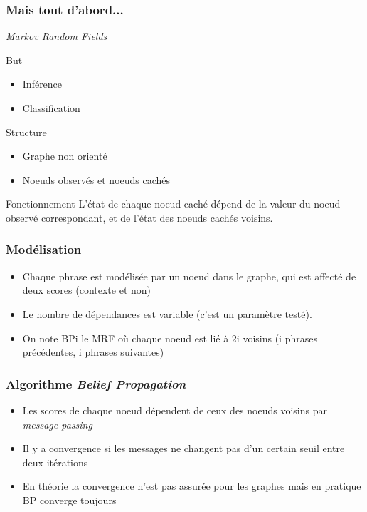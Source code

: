 \documentclass[12pt]{beamer}
\begin{document}
\begin{frame}
  \frametitle{Mais tout d'abord...}
  \textit{Markov Random Fields}
  \begin{block}{But}
  \begin{itemize}
   \item Inférence
   \item Classification
  \end{itemize}
  \end{block}
  
  \begin{block}{Structure}
  \begin{itemize}
   \item Graphe non orienté
   \item Noeuds observés et noeuds cachés
  \end{itemize}
  \end{block}
  
  \begin{block}{Fonctionnement}
  L'état de chaque noeud caché dépend de la valeur du noeud observé correspondant,
  et de l'état des noeuds cachés voisins.
  \end{block}
\end{frame}

\begin{frame}
  \frametitle{Modélisation}
  \begin{itemize}
   \item Chaque phrase est modélisée par un noeud dans le graphe, qui est affecté de deux scores (contexte et non)
   \item Le nombre de dépendances est variable (c'est un paramètre testé).
   \item On note BPi le MRF où chaque noeud est lié à 2i voisins (i phrases précédentes, i phrases suivantes)
  \end{itemize}
\end{frame}

\begin{frame}
  \frametitle{Algorithme \textit{Belief Propagation}}
  \begin{itemize}
   \item Les scores de chaque noeud dépendent de ceux des noeuds voisins par \textit{message passing}
   \item Il y a convergence si les messages ne changent pas d'un certain seuil entre deux itérations
   \item En théorie la convergence n'est pas assurée pour les graphes mais en pratique BP converge toujours
  \end{itemize}
\end{frame}
\end{document}
